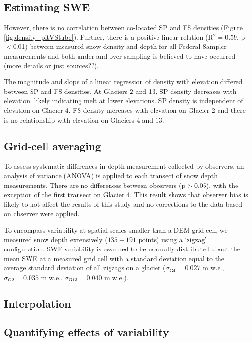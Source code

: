 \documentclass[twocolumn,letterpaper]{igs}
\begin{document}
\subsection{Estimating SWE}

However, there is no correlation between co-located SP and FS densities (Figure \ref{fig:density_pitVStube}). Further, there is a positive linear relation (R$^2= 0.59$, p$<$0.01) between measured snow density and depth for all Federal Sampler measurements and both under and over sampling is believed to have occurred (more details or just sources??). 

The magnitude and slope of a linear regression of density with elevation differed between
SP and FS densities. At Glaciers 2 and 13, SP density decreases with elevation, likely indicating melt at lower elevations. SP density is independent of elevation on Glacier 4. FS density increases with elevation on Glacier 2 and there is no relationship with elevation on Glaciers 4 and 13. 

\subsection{Grid-cell averaging}


To assess systematic differences in depth measurement collected by observers, an analysis of variance (ANOVA) is applied to each transect of snow depth measurements. There are no differences between observers (p$>$0.05), with the exception of the first transect on Glacier 4. This result shows that observer bias is likely to not affect the results of this study and no corrections to the data based on observer were applied.

To encompass variability at spatial scales smaller than a DEM grid cell, we measured snow depth extensively ($135-191$ points) using a `zigzag' configuration. SWE variability is assumed to be normally distributed about the mean SWE at a measured grid cell with a standard deviation equal to the average standard deviation of all zigzags on a glacier ($\sigma_{\mathrm{G4}} =  0.027$ m w.e., $\sigma_{\mathrm{G2}} =  0.035$ m w.e., $\sigma_{\mathrm{G13}} =  0.040$ m w.e.).



\subsection{Interpolation}




\subsection{Quantifying effects of variability}
\end{document}
